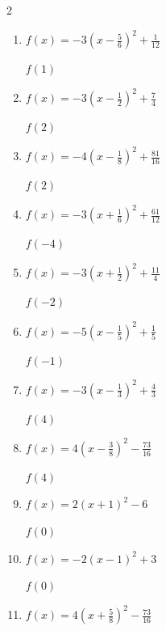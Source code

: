\begin{multicols}{2}
\begin{enumerate}
$f(5)$
        \phantom{$=153$}

  \item $\displaystyle f(x)=-3\left( x-\frac{5}{6}\right)^{2}+\frac{1}{12}$

$f(1)$
        \phantom{$=0$}

  \item $\displaystyle f(x)=-3\left( x-\frac{1}{2}\right)^{2}+\frac{7}{4}$

$f(2)$
        \phantom{$=-5$}

\columnbreak %

\resetques

  \item $\displaystyle f(x)=-4\left( x-\frac{1}{8}\right)^{2}+\frac{81}{16}$

$f(2)$
        \phantom{$=-9$}

  \item $\displaystyle f(x)=-3\left( x+\frac{1}{6}\right)^{2}+\frac{61}{12}$

$f(-4)$
        \phantom{$=-39$}

  \item $\displaystyle f(x)=-3\left( x+\frac{1}{2}\right)^{2}+\frac{11}{4}$

$f(-2)$
        \phantom{$=-4$}

  \item $\displaystyle f(x)=-5\left( x-\frac{1}{5}\right)^{2}+\frac{1}{5}$

$f(-1)$
        \phantom{$=-7$}

  \item $\displaystyle f(x)=-3\left( x-\frac{1}{3}\right)^{2}+\frac{4}{3}$

$f(4)$
        \phantom{$=-39$}

\columnbreak %

  \item $\displaystyle f(x)=4\left( x-\frac{3}{8}\right)^{2}-\frac{73}{16}$

$f(4)$
        \phantom{$=48$}

  \item $\displaystyle f(x)=2\left( x+1\right)^{2}-6$

$f(0)$
        \phantom{$=-4$}

  \item $\displaystyle f(x)=-2\left( x-1\right)^{2}+3$

$f(0)$
        \phantom{$=1$}

  \item $\displaystyle f(x)=4\left( x+\frac{5}{8}\right)^{2}-\frac{73}{16}$


\end{enumerate}
\end{multicols}
